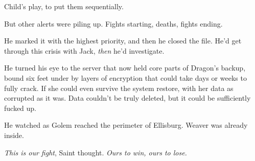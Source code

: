 Child's play, to put them sequentially.



But other alerts were piling up.  Fights starting, deaths, fights ending.



He marked it with the highest priority, and then he closed the file.  He'd get through this crisis with Jack, \emph{then} he'd investigate.



He turned his eye to the server that now held core parts of Dragon's backup, bound six feet under by layers of encryption that could take days or weeks to fully crack.  If she could even survive the system restore, with her data as corrupted as it was.  Data couldn't be truly deleted, but it could be sufficiently fucked up.



He watched as Golem reached the perimeter of Ellisburg.  Weaver was already inside.



\emph{This is our fight}, Saint thought.  \emph{Ours to win, ours to lose.}





